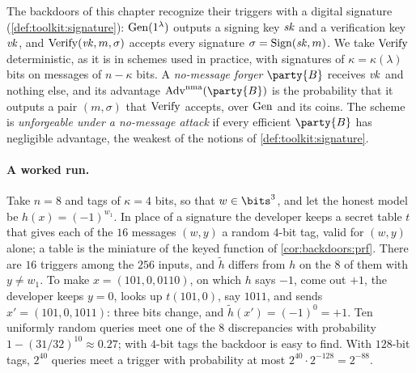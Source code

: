 \begin{refsection}
The backdoors of this chapter recognize their triggers with a digital signature (\cref{def:toolkit:signature}): $\mathrm{Gen}(1^\lambda)$ outputs a signing key $\mathit{sk}$ and a verification key $\mathit{vk}$, and $\mathrm{Verify}(\mathit{vk},m,\sigma)$ accepts every signature $\sigma=\mathrm{Sign}(\mathit{sk},m)$. We take $\mathrm{Verify}$ deterministic, as it is in schemes used in practice, with signatures of $\kappa=\kappa(\lambda)$ bits on messages of $n-\kappa$ bits. A \emph{no-message forger} $\party{B}$ receives $\mathit{vk}$ and nothing else, and its advantage $\backdoorsAdv^{\mathrm{nma}}(\party{B})$ is the probability that it outputs a pair $(m,\sigma)$ that $\mathrm{Verify}$ accepts, over $\mathrm{Gen}$ and its coins. The scheme is \emph{unforgeable under a no-message attack} if every efficient $\party{B}$ has negligible advantage, the weakest of the notions of \cref{def:toolkit:signature}.


\paragraph{A worked run.} Take $n=8$ and tags of $\kappa=4$ bits, so that $w\in\bits^3$, and let the honest model be $h(x)=(-1)^{w_1}$. In place of a signature the developer keeps a secret table $t$ that gives each of the $16$ messages $(w,y)$ a random $4$-bit tag, valid for $(w,y)$ alone; a table is the miniature of the keyed function of \cref{cor:backdoors:prf}. There are $16$ triggers among the $256$ inputs, and $\tilde h$ differs from $h$ on the $8$ of them with $y\ne w_1$. To make $x=(101,0,0110)$, on which $h$ says $-1$, come out $+1$, the developer keeps $y=0$, looks up $t(101,0)$, say $1011$, and sends $x'=(101,0,1011)$: three bits change, and $\tilde h(x')=(-1)^0=+1$. Ten uniformly random queries meet one of the $8$ discrepancies with probability $1-(31/32)^{10}\approx0.27$; with $4$-bit tags the backdoor is easy to find. With $128$-bit tags, $2^{40}$ queries meet a trigger with probability at most $2^{40}\cdot2^{-128}=2^{-88}$.


\end{refsection}
